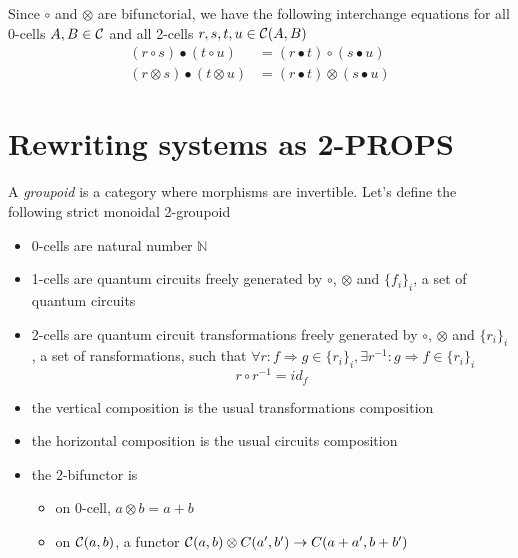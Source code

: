 \documentclass[a4paper]{article}
\begin{document}
\begin{remark}
Since $\circ$ and $\otimes$ are bifunctorial, we have the following
interchange equations for all 0-cells $A, B \in {\cal C}$ and all 2-cells $r, s, t, u \in {\cal C}(A, B)$
\begin{align}
(r \circ s) \bullet (t \circ u) &= (r \bullet t) \circ (s \bullet u) \\
(r \otimes s) \bullet (t \otimes u) &= (r \bullet t) \otimes (s \bullet u)
\end{align}
\end{remark}


\section{Rewriting systems as 2-PROPS}
\label{sec:rewriting}

A \emph{groupoid} is a category where morphisms are invertible.
Let's define the following strict monoidal 2-groupoid \catC

\begin{itemize}
\item 0-cells are natural number $\mathbb{N}$
\item 1-cells are quantum circuits freely generated by $\circ$, $\otimes$ and $\{f_i\}_i$, a set of quantum circuits
\item 2-cells are quantum circuit transformations freely generated by $\circ$, $\otimes$ and $\{r_i\}_i$, a set of ransformations, such that $\forall r: f \Rightarrow g \in \{r_i\}_i, \exists r^{-1}: g \Rightarrow f \in \{r_i\}_i$
\[
r \circ r^{-1} = id_f
\]
\item the vertical composition is the usual transformations composition
\item the horizontal composition is the usual circuits composition
\item the 2-bifunctor is
\begin{itemize}
\item on 0-cell, $a \otimes b = a + b$
\item on ${\cal C}(a, b)$, a functor ${\cal C}(a, b) \otimes C(a', b') \to C(a + a', b + b')$
\end{itemize}
\end{itemize}
\end{document}
